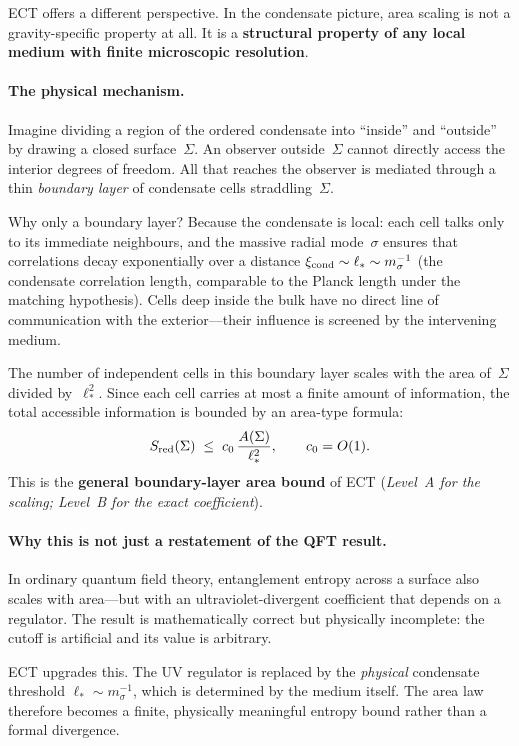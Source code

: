 \documentclass[11pt,a4paper]{article}
\begin{document}
ECT offers a different perspective.
In the condensate picture, area scaling is not a gravity-specific
property at all.
It is a \textbf{structural property of any local medium with finite
microscopic resolution}.

\paragraph{The physical mechanism.}
Imagine dividing a region of the ordered condensate into ``inside''
and ``outside'' by drawing a closed surface~$\Sigma$.
An observer outside~$\Sigma$ cannot directly access the interior
degrees of freedom.
All that reaches the observer is mediated through a thin
\emph{boundary layer} of condensate cells straddling~$\Sigma$.

Why only a boundary layer?
Because the condensate is local: each cell talks only to its
immediate neighbours, and the massive radial mode~$\sigma$ ensures
that correlations decay exponentially over a distance
$\xi_{\rm cond}\sim\ell_*\sim m_\sigma^{-1}$
(the condensate correlation length, comparable to the Planck
length under the matching hypothesis).
Cells deep inside the bulk have no direct line of communication
with the exterior---their influence is screened by the intervening
medium.

The number of independent cells in this boundary layer scales with
the area of~$\Sigma$ divided by~$\ell_*^2$.
Since each cell carries at most a finite amount of information,
the total accessible information is bounded by an area-type formula:
\begin{equation}
  S_{\rm red}(\Sigma)
  \;\le\;
  c_0\,\frac{A(\Sigma)}{\ell_*^2},
  \qquad
  c_0=O(1).
\end{equation}
This is the \textbf{general boundary-layer area bound} of ECT
(\emph{Level~A for the scaling; Level~B for the exact coefficient}).

\paragraph{Why this is not just a restatement of the QFT result.}
In ordinary quantum field theory, entanglement entropy across a
surface also scales with area---but with an ultraviolet-divergent
coefficient that depends on a regulator.
The result is mathematically correct but physically incomplete:
the cutoff is artificial and its value is arbitrary.

ECT upgrades this.
The UV regulator is replaced by the \emph{physical} condensate
threshold $\ell_*\sim m_\sigma^{-1}$, which is determined by the
medium itself.
The area law therefore becomes a finite, physically meaningful
entropy bound rather than a formal divergence.
\end{document}
